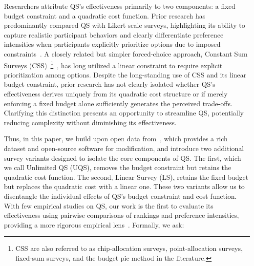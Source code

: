 
Researchers attribute QS's effectiveness primarily to two components: a fixed budget constraint and a quadratic cost function. Prior research has predominantly compared QS with Likert scale surveys, highlighting its ability to capture realistic participant behaviors and clearly differentiate preference intensities when participants explicitly prioritize options due to imposed constraints~\cite{chengCanShowWhat2021, cavaille2024cares}. A closely related but simpler forced-choice approach, Constant Sum Surveys (CSS)~\footnote{CSS are also referred to as chip-allocation surveys, point-allocation surveys, fixed-sum surveys, and the budget pie method in the literature.}~\cite{metfesselProposalQuantitativeReporting1947}, has long utilized a linear constraint to require explicit prioritization among options. Despite the long-standing use of CSS and its linear budget constraint, prior research has not clearly isolated whether QS's effectiveness derives uniquely from its quadratic cost structure or if merely enforcing a fixed budget alone sufficiently generates the perceived trade-offs. Clarifying this distinction presents an opportunity to streamline QS, potentially reducing complexity without diminishing its effectiveness.


Thus, in this paper, we build upon open data from~\citet{chengCanShowWhat2021, illinoisdatabankIDB-1928463}, which provides a rich dataset and open-source software for modification, and introduce two additional survey variants designed to isolate the core components of QS. The first, which we call Unlimited QS (UQS), removes the budget constraint but retains the quadratic cost function. The second, Linear Survey (LS), retains the fixed budget but replaces the quadratic cost with a linear one. These two variants allow us to disentangle the individual effects of QS's budget constraint and cost function. With few empirical studies on QS, our work is the first to evaluate its effectiveness using pairwise comparisons of rankings and preference intensities, providing a more rigorous empirical lens~\cite{collewet2023preference}. Formally, we ask:

